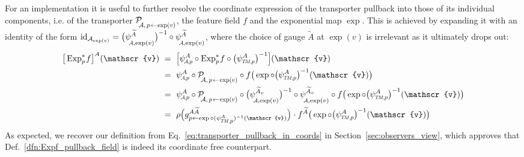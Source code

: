 For an implementation it is useful to further resolve the coordinate expression of the transporter pullback into those of its individual components, i.e. of the transporter
$\mathcal{P}_{\mkern-4mu\overset{}{\protect\scalebox{.75}{$\!\A$},\protect\scalebox{.75}{$\, p\!\leftarrow\!\exp(v)$}}}$,
the feature field $f$ and the exponential map $\exp$.
This is achieved by expanding it with an identity of the form
$\id_{\A_{\exp(v)}} = \big(\psiAexpnop^{\widetilde{A}} \big)^{-1} \circ \psiAexpnop^{\widetilde{A}}$,
where the choice of gauge $\widetilde{A}$ at $\exp(v)$ is irrelevant as it ultimately drops out:
\begin{align}\label{eq:coordinate_expression_transporter_pullback_62}
    \big[\Expspf \big]^A (\mathscr{v})
    \ &=\ \pig[ \psiAp^A \circ \Expspf \circ \big(\psiTMp^A \big)^{-1} \pig] (\mathscr{v}) \notag \\
    \ &=\ \psiAp^A \circ 
        \mathcal{P}_{\mkern-4mu\overset{}{\protect\scalebox{.75}{$\!\A$},\protect\scalebox{.75}{$\, p\!\leftarrow\!\exp(v)$}}}
     \circ f \big( \exp \circ \big(\psiTMp^A\big)^{-1} (\mathscr{v})\big) \notag \\
    \ &=\ \psiAp^A \circ 
        \mathcal{P}_{\mkern-4mu\overset{}{\protect\scalebox{.75}{$\!\A$},\protect\scalebox{.75}{$\, p\!\leftarrow\!\exp(v)$}}}
     \circ \big(\psiAexpnop^{\widetilde{A}_v} \big)^{-1} \circ \psiAexpnop^{\widetilde{A}_v}
     \circ f \big( \exp \circ \big(\psiTMp^A\big)^{-1} (\mathscr{v})\big) \notag \\
    \ &=\ \rho\pig( g^{A\widetilde{A}}_{p\leftarrow\exp\circ (\psiTMp^A)^{-1}(\mathscr{v})} \pig) \mkern1mu
     \cdot f^{\widetilde{A}} \big( \exp \circ \big(\psiTMp^A\big)^{-1} (\mathscr{v})\big) \notag \\
\end{align}
As expected, we recover our definition from Eq.~\eqref{eq:transporter_pullback_in_coords} in Section~\ref{sec:observers_view}, which approves that Def.~\ref{dfn:Expf_pullback_field} is indeed its coordinate free counterpart.


